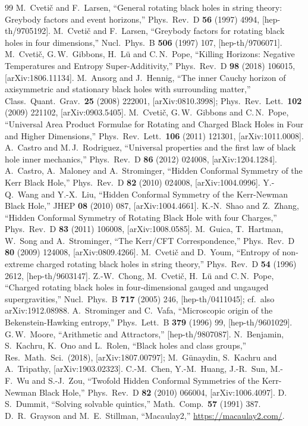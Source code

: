 \documentclass[11pt,a4paper]{article}
\theoremstyle{definition}
\theoremstyle{remark}
\begin{document}
\begin{thebibliography}{99}
 M.~Cveti\v{c} and F.~Larsen,
``General rotating black holes in string theory: Greybody factors and event
horizons,'' Phys.\ Rev.\ D {\bf 56} (1997) 4994, [hep-th/9705192].
 M.~Cveti\v{c} and F.~Larsen,
``Greybody factors for rotating black holes in four dimensions,''
Nucl.\ Phys.\ B {\bf 506} (1997) 107, [hep-th/9706071].
 M.~Cveti\v{c}, G.\,W.~Gibbons, H.~L\"u and C.\,N.~Pope,
``Killing Horizons: Negative Temperatures and Entropy Super-Additivity,''
Phys.\ Rev.\ D {\bf 98} (2018) 106015, [arXiv:1806.11134].
 M.~Ansorg and J.~Hennig,
``The inner Cauchy horizon of axisymmetric and stationary black holes with
surrounding matter,'' Class.\ Quant.\ Grav.\ {\bf 25} (2008) 222001,
[arXiv:0810.3998]; Phys.\ Rev.\ Lett.\ {\bf 102} (2009) 221102,
[arXiv:0903.5405].
 M.~Cveti\v{c}, G.\,W.~Gibbons and C.\,N.~Pope,
``Universal Area Product Formulae for Rotating and Charged Black Holes in
Four and Higher Dimensions,'' Phys.\ Rev.\ Lett.\ {\bf 106} (2011) 121301,
[arXiv:1011.0008].
 A.~Castro and M.\,J.~Rodriguez,
``Universal properties and the first law of black hole inner mechanics,''
Phys.\ Rev.\ D {\bf 86} (2012) 024008, [arXiv:1204.1284].
 A.~Castro, A.~Maloney and A.~Strominger,
``Hidden Conformal Symmetry of the Kerr Black Hole,''
Phys.\ Rev.\ D {\bf 82} (2010) 024008, [arXiv:1004.0996].
 Y.-Q.~Wang and Y.-X.~Liu,
``Hidden Conformal Symmetry of the Kerr-Newman Black Hole,''
JHEP {\bf 08} (2010) 087, [arXiv:1004.4661].
 K.-N.~Shao and Z.~Zhang,
``Hidden Conformal Symmetry of Rotating Black Hole with four Charges,''
Phys.\ Rev.\ D {\bf 83} (2011) 106008, [arXiv:1008.0585].
 M.~Guica, T.~Hartman, W.~Song and A.~Strominger,
``The Kerr/CFT Correspondence,''
Phys.\ Rev.\ D {\bf 80} (2009) 124008, [arXiv:0809.4266].
 M.~Cveti\v{c} and D.~Youm,
``Entropy of non-extreme charged rotating black holes in string theory,''
Phys.\ Rev.\ D {\bf 54} (1996) 2612, [hep-th/9603147].
 Z.-W.~Chong, M.~Cveti\v{c}, H.~L\"u and C.\,N.~Pope,
``Charged rotating black holes in four-dimensional gauged and ungauged
supergravities,'' Nucl.\ Phys.\ B {\bf 717} (2005) 246, [hep-th/0411045];
cf.\ also arXiv:1912.08988.
 A.~Strominger and C.~Vafa,
``Microscopic origin of the Bekenstein-Hawking entropy,''
Phys.\ Lett.\ B {\bf 379} (1996) 99, [hep-th/9601029].
 G.\,W.~Moore, ``Arithmetic and Attractors,''
[hep-th/9807087].
 N.~Benjamin, S.~Kachru, K.~Ono and L.~Rolen,
``Black holes and class groups,'' Res.\ Math.\ Sci.\ (2018),
[arXiv:1807.00797]; M.~G\"unaydin, S.~Kachru and A.~Tripathy,
[arXiv:1903.02323].
 C.-M.~Chen, Y.-M.~Huang, J.-R.~Sun, M.-F.~Wu and S.-J.~Zou,
``Twofold Hidden Conformal Symmetries of the Kerr-Newman Black Hole,''
Phys.\ Rev.\ D {\bf 82} (2010) 066004, [arXiv:1006.4097].
 D.\,S.~Dummit, ``Solving solvable quintics,''
Math.\ Comp.\ {\bf 57} (1991) 387.
 D.~R.~Grayson and M.~E.~Stillman,
``Macaulay2,'' \url{https://macaulay2.com/}.
\end{thebibliography}
\end{document}

